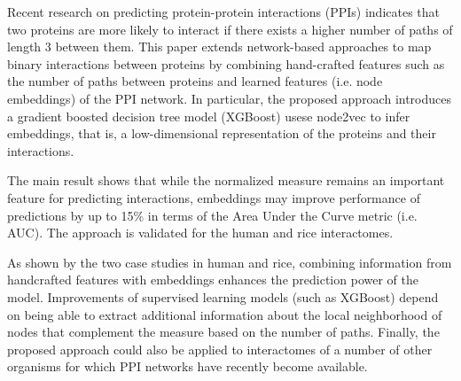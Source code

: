 Recent research on predicting protein-protein
interactions (PPIs) indicates that two proteins are more likely to interact if 
there exists a higher number of paths of length 3 between them. This paper
extends network-based approaches to map binary interactions between proteins 
by combining hand-crafted features such as the number of paths between proteins 
and learned features (i.e. node embeddings) of the PPI network. In particular, 
the proposed approach introduces a gradient boosted decision tree model 
(XGBoost) usese node2vec to infer embeddings, that is, a low-dimensional representation
of the proteins and their interactions.

The main result shows that while the normalized measure remains an important feature
for predicting interactions, embeddings may improve performance of predictions by up 
to 15\% in terms of the Area Under the Curve metric (i.e. AUC). The approach is validated for 
the human and rice interactomes.

As shown by the two case studies in human and rice, combining information from 
handcrafted features with embeddings enhances the prediction power of the model. 
Improvements of supervised learning models (such as XGBoost) depend on being able 
to extract additional information about the local neighborhood of nodes that 
complement the measure based on the number of paths. Finally, the proposed 
approach could also be applied to interactomes of a number of other organisms for which
PPI networks have recently become available.